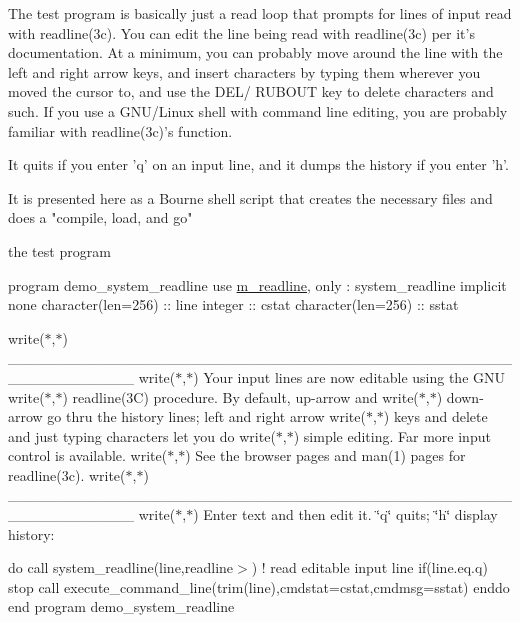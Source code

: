 \begin{DoxyVerb}The test program is basically just a read loop that prompts for
lines of input read with readline(3c). You can edit the line being
read with readline(3c) per it's documentation. At a minimum, you can
probably move around the line with the left and right arrow keys, and
insert characters by typing them wherever you moved the cursor to,
and use the DEL/ RUBOUT key to delete characters and such. If you use
a GNU/Linux shell with command line editing, you are probably familiar
with readline(3c)'s function.

It quits if you enter 'q' on an input line, and it dumps the history if
you enter 'h'.

It is presented here as a Bourne shell script that creates the necessary
files and does a "compile, load, and go"
\end{DoxyVerb}


the test program

program demo\+\_\+system\+\_\+readline use \hyperlink{namespacem__readline}{m\+\_\+readline}, only \+: system\+\_\+readline implicit none character(len=256) \+:\+: line integer \+:\+: cstat character(len=256) \+:\+: sstat

write($\ast$,$\ast$)\textquotesingle{} \+\_\+\+\_\+\+\_\+\+\_\+\+\_\+\+\_\+\+\_\+\+\_\+\+\_\+\+\_\+\+\_\+\+\_\+\+\_\+\+\_\+\+\_\+\+\_\+\+\_\+\+\_\+\+\_\+\+\_\+\+\_\+\+\_\+\+\_\+\+\_\+\+\_\+\+\_\+\+\_\+\+\_\+\+\_\+\+\_\+\+\_\+\+\_\+\+\_\+\+\_\+\+\_\+\+\_\+\+\_\+\+\_\+\+\_\+\+\_\+\+\_\+\+\_\+\+\_\+\+\_\+\+\_\+\+\_\+\+\_\+\+\_\+\+\_\+\+\_\+\+\_\+\+\_\+\+\_\+\+\_\+\+\_\+\+\_\+\+\_\+\+\_\+\+\_\+\+\_\+\textquotesingle{} write($\ast$,$\ast$)\textquotesingle{} Your input lines are now editable using the G\+NU\textquotesingle{} write($\ast$,$\ast$)\textquotesingle{} readline(3\+C) procedure. By default, up-\/arrow and\textquotesingle{} write($\ast$,$\ast$)\textquotesingle{} down-\/arrow go thru the history lines; left and right arrow\textquotesingle{} write($\ast$,$\ast$)\textquotesingle{} keys and delete and just typing characters let you do\textquotesingle{} write($\ast$,$\ast$)\textquotesingle{} simple editing. Far more input control is available.\textquotesingle{} write($\ast$,$\ast$)\textquotesingle{} See the browser pages and man(1) pages for readline(3c).\textquotesingle{} write($\ast$,$\ast$)\textquotesingle{} \+\_\+\+\_\+\+\_\+\+\_\+\+\_\+\+\_\+\+\_\+\+\_\+\+\_\+\+\_\+\+\_\+\+\_\+\+\_\+\+\_\+\+\_\+\+\_\+\+\_\+\+\_\+\+\_\+\+\_\+\+\_\+\+\_\+\+\_\+\+\_\+\+\_\+\+\_\+\+\_\+\+\_\+\+\_\+\+\_\+\+\_\+\+\_\+\+\_\+\+\_\+\+\_\+\+\_\+\+\_\+\+\_\+\+\_\+\+\_\+\+\_\+\+\_\+\+\_\+\+\_\+\+\_\+\+\_\+\+\_\+\+\_\+\+\_\+\+\_\+\+\_\+\+\_\+\+\_\+\+\_\+\+\_\+\+\_\+\+\_\+\+\_\+\+\_\+\+\_\+\textquotesingle{} write($\ast$,$\ast$)\textquotesingle{} Enter text and then edit it. \char`\"{}q\char`\"{} quits; \char`\"{}h\char`\"{} display history\+:\textquotesingle{}

do call system\+\_\+readline(line,\textquotesingle{}readline$>$\textquotesingle{}) ! read editable input line if(line.\+eq.\textquotesingle{}q\textquotesingle{}) stop call execute\+\_\+command\+\_\+line(trim(line),cmdstat=cstat,cmdmsg=sstat) enddo end program demo\+\_\+system\+\_\+readline 